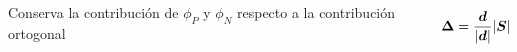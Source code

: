 \begin{frame}
\begin{columns}
    \begin{center}
      Conserva la contribuci\'on de $\phi_P$ y $\phi_N$ respecto a la contribuci\'on ortogonal
    \end{center}

    $$ \boldsymbol{\Delta} = \dfrac{ \boldsymbol{d} }{ |\boldsymbol{d}| } |\boldsymbol{S}| $$

    \end{columns}
    
\end{frame}













